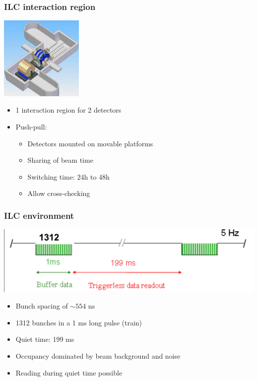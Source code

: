 \documentclass{beamer}
\begin{document}

  \begin{frame}[plain]
    \frametitle{ILC interaction region}

    \begin{center}
      \includegraphics[width = 0.3\textwidth]{Pictures/ILC_Hall.png}
    \end{center}

    \begin{itemize}
      \item 1 interaction region for 2 detectors
      \item Push-pull:
      \begin{itemize}
        \item Detectors mounted on movable platforms
        \item Sharing of beam time
        \item Switching time: 24h to 48h
        \item Allow cross-checking
      \end{itemize}
    \end{itemize}
  \end{frame}


  \begin{frame}[plain]
    \frametitle{ILC environment}

    \begin{center}
    \includegraphics[width = \textwidth]{Pictures/bunchTrainILC.png}
    \end{center}

    \begin{itemize}
      \item Bunch spacing of $\sim 554$ ns
      \item 1312 bunches in a 1 ms long pulse (train)
      \item Quiet time: 199 ms
      \item Occupancy dominated by beam background and noise
      \item Reading during quiet time possible
    \end{itemize}

  \end{frame}
\end{document}
